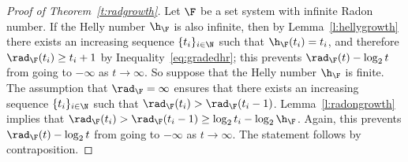 %
\begin{proof}[Proof of Theorem~\ref{t:radgrowth}]
  Let $\F$ be a set system with infinite Radon number. If the Helly number $\h_\F$ is also infinite, then by Lemma~\ref{l:hellygrowth} there exists an increasing sequence $\{t_i\}_{i \in \N}$ such that $\h_\F(t_i) = t_i$, and therefore $\rad_\F(t_i) \ge t_i+1$ by Inequality~\eqref{eq:gradedhr}; this prevents $\rad_\F(t)-\log_2 t$ from going to $-\infty$ as $t \to \infty$. So suppose that the Helly number $\h_\F$ is finite. The assumption that $\rad_\F=\infty$ ensures that there exists an increasing sequence $\{t_i\}_{i \in \N}$ such that $\rad_\F(t_i) > \rad_\F(t_i-1)$. Lemma~\ref{l:radongrowth} implies that $\rad_\F(t_i) > \rad_\F(t_i-1) \ge \log_2 t_i - \log_2 \h_\F$. Again, this prevents $\rad_\F(t)-\log_2 t$ from going to $-\infty$ as $t \to \infty$. The statement follows by contraposition.
\end{proof}
%
%
